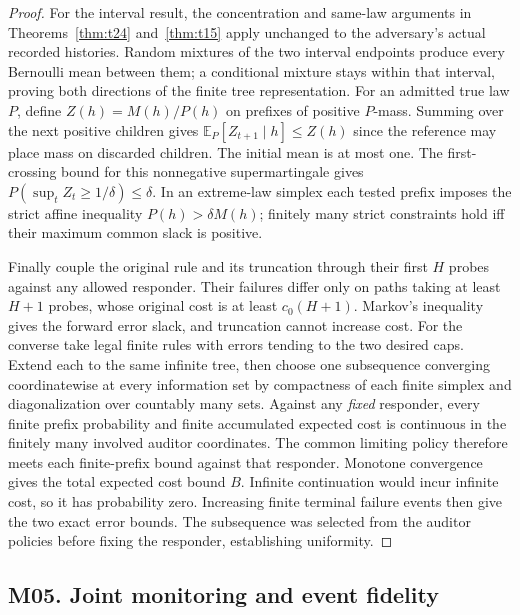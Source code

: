 \begin{proof}
For the interval result, the concentration and same-law arguments in Theorems~\ref{thm:t24} and~\ref{thm:t15} apply unchanged to the adversary's actual recorded histories. Random mixtures of the two interval endpoints produce every Bernoulli mean between them; a conditional mixture stays within that interval, proving both directions of the finite tree representation. For an admitted true law \(P\), define \(Z(h)=M(h)/P(h)\) on prefixes of positive \(P\)-mass. Summing over the next positive children gives \(\mathbb E_P[Z_{t+1}\mid h]\le Z(h)\) since the reference may place mass on discarded children. The initial mean is at most one. The first-crossing bound for this nonnegative supermartingale gives \(P(\sup_t Z_t\ge1/\delta)\le\delta\). In an extreme-law simplex each tested prefix imposes the strict affine inequality \(P(h)>\delta M(h)\); finitely many strict constraints hold iff their maximum common slack is positive.

Finally couple the original rule and its truncation through their first \(H\) probes against any allowed responder. Their failures differ only on paths taking at least \(H+1\) probes, whose original cost is at least \(c_0(H+1)\). Markov's inequality gives the forward error slack, and truncation cannot increase cost. For the converse take legal finite rules with errors tending to the two desired caps. Extend each to the same infinite tree, then choose one subsequence converging coordinatewise at every information set by compactness of each finite simplex and diagonalization over countably many sets. Against any \emph{fixed} responder, every finite prefix probability and finite accumulated expected cost is continuous in the finitely many involved auditor coordinates. The common limiting policy therefore meets each finite-prefix bound against that responder. Monotone convergence gives the total expected cost bound \(B\). Infinite continuation would incur infinite cost, so it has probability zero. Increasing finite terminal failure events then give the two exact error bounds. The subsequence was selected from the auditor policies before fixing the responder, establishing uniformity.

\end{proof}

\subsection{M05. Joint monitoring and event fidelity}

\label{ext:m05}

